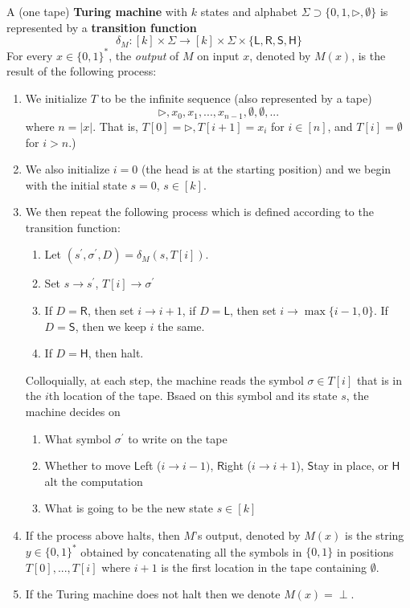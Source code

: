 \documentclass{article}
\begin{document}
  \begin{definition}
  A (one tape) \textbf{Turing machine} with $k$ states and alphabet $\Sigma \supset \{0, 1, \triangleright, \emptyset\}$ is represented by a \textbf{transition function} 
  \[\delta_M: [k] \times \Sigma \longrightarrow [k] \times \Sigma \times \{\mathsf{L, R, S, H}\}\]
  For every $x \in \{0,1\}^*$, the \textit{output} of $M$ on input $x$, denoted by $M(x)$, is the result of the following process: 
  \begin{enumerate}
      \item We initialize $T$ to be the infinite sequence (also represented by a tape)
      \[\triangleright, x_0, x_1, ..., x_{n-1}, \emptyset, \emptyset, ...\]
      where $n = |x|$. That is, $T[0] = \triangleright, T[i+1] = x_i$ for $i \in [n]$, and $T[i] = \emptyset$ for $i>n$.)
      \item We also initialize $i = 0$ (the head is at the starting position) and we begin with the initial state $s=0$, $s \in [k]$. 
      \item We then repeat the following process which is defined according to the transition function: 
      \begin{enumerate}
          \item Let $(s^\prime, \sigma^\prime, D) = \delta_M (s, T[i])$.
          \item Set $s \rightarrow s^\prime$, $T[i] \rightarrow \sigma^\prime$
          \item If $D = \mathsf{R}$, then set $i \rightarrow i+1$, if $D = \mathsf{L}$, then set $i \rightarrow \max\{i-1,0\}$. If $D = \mathsf{S}$, then we keep $i$ the same. 
          \item If $D = \mathsf{H}$, then halt. 
      \end{enumerate}
      Colloquially, at each step, the machine reads the symbol $\sigma \in T[i]$ that is in the $i$th location of the tape. Bsaed on this symbol and its state $s$, the machine decides on
      \begin{enumerate}
          \item What symbol $\sigma^\prime$ to write on the tape
          \item Whether to move $\mathsf{L}$eft ($i \rightarrow i-1)$, $\mathsf{R}$ight ($i \rightarrow i+1$), $\mathsf{S}$tay in place, or $\mathsf{H}$alt the computation 
          \item What is going to be the new state $s \in [k]$
      \end{enumerate}
      \item If the process above halts, then $M$'s output, denoted by $M(x)$ is the string $y \in \{0,1\}^*$ obtained by concatenating all the symbols in $\{0,1\}$ in positions $T[0], ..., T[i]$ where $i+1$ is the first location in the tape containing $\emptyset$. 
      \item If the Turing machine does not halt then we denote $M(x) = \perp$. 
  \end{enumerate}
  \end{definition}
\end{document}
